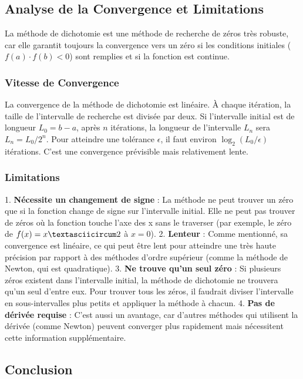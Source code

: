 \documentclass[12pt,a4paper]{report}
\begin{document}
\subsection{Analyse de la Convergence et Limitations}

La méthode de dichotomie est une méthode de recherche de zéros très robuste, car elle garantit toujours la convergence vers un zéro si les conditions initiales ($f(a) \cdot f(b) < 0$) sont remplies et si la fonction est continue.

\subsubsection{Vitesse de Convergence}

La convergence de la méthode de dichotomie est linéaire. À chaque itération, la taille de l'intervalle de recherche est divisée par deux. Si l'intervalle initial est de longueur $L_0 = b - a$, après $n$ itérations, la longueur de l'intervalle $L_n$ sera $L_n = L_0 / 2^n$. Pour atteindre une tolérance $\epsilon$, il faut environ $\log_2(L_0 / \epsilon)$ itérations. C'est une convergence prévisible mais relativement lente.

\subsubsection{Limitations}

1.  \textbf{Nécessite un changement de signe} : La méthode ne peut trouver un zéro que si la fonction change de signe sur l'intervalle initial. Elle ne peut pas trouver de zéros où la fonction touche l'axe des x sans le traverser (par exemple, le zéro de $f(x) = x\textasciicircum 2$ à $x=0$).
2.  \textbf{Lenteur} : Comme mentionné, sa convergence est linéaire, ce qui peut être lent pour atteindre une très haute précision par rapport à des méthodes d'ordre supérieur (comme la méthode de Newton, qui est quadratique).
3.  \textbf{Ne trouve qu'un seul zéro} : Si plusieurs zéros existent dans l'intervalle initial, la méthode de dichotomie ne trouvera qu'un seul d'entre eux. Pour trouver tous les zéros, il faudrait diviser l'intervalle en sous-intervalles plus petits et appliquer la méthode à chacun.
4.  \textbf{Pas de dérivée requise} : C'est aussi un avantage, car d'autres méthodes qui utilisent la dérivée (comme Newton) peuvent converger plus rapidement mais nécessitent cette information supplémentaire.

\subsection{Conclusion}
\end{document}
